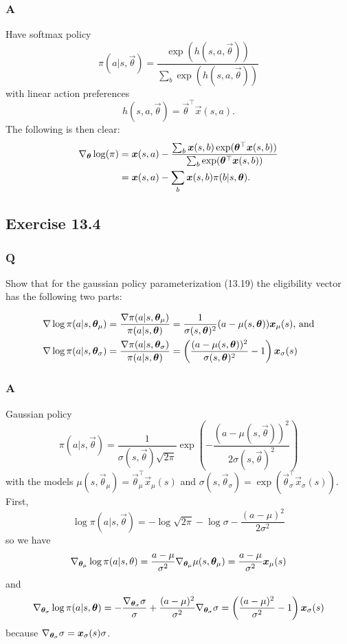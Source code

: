 \subsubsection*{A}
Have softmax policy
\[
    \pi(a \vert{} s, \vec{\theta}) = \frac{\exp(h(s, a, \vec{\theta}))}{\sum_b \exp(h(s, a, \vec{\theta}))}
\]
with linear action preferences 
\[
    h(s, a, \vec{\theta}) = \vec{\theta}^\top \vec{x}(s, a).
\]
The following is then clear:
\begin{align*}
    \nabla_{\boldsymbol{\theta}} \log(\pi) &= \boldsymbol{x}(s, a) - \frac{\sum_b \boldsymbol{x}(s, b) \exp(\boldsymbol{\theta}^\top \boldsymbol{x}(s, b))}{\sum_b \exp(\boldsymbol{\theta}^\top \boldsymbol{x}(s, b))} \\
                                   &= \boldsymbol{x}(s, a) - \sum_b \boldsymbol{x}(s, b) \pi(b \vert{} s, \boldsymbol{\theta}).
\end{align*}

\subsection{Exercise 13.4}
\subsubsection*{Q}
Show that for the gaussian policy parameterization (13.19) the eligibility vector has the following two parts:

\begin{align*}
    \nabla \log \pi(a \vert{} s, \boldsymbol{\theta}_\mu) &= \frac{\nabla \pi(a \vert{} s, \boldsymbol{\theta}_\mu)}{\pi(a \vert{} s, \boldsymbol{\theta})} = \frac{1}{\sigma(s, \boldsymbol{\theta})^2} (a - \mu(s, \boldsymbol{\theta}))\boldsymbol{x}_\mu(s)\text{, and}\\
    \nabla \log \pi(a \vert{} s, \boldsymbol{\theta}_\sigma) &= \frac{\nabla \pi(a \vert{} s, \boldsymbol{\theta}_\sigma)}{\pi(a \vert{} s, \boldsymbol{\theta})} = \left( \frac{(a - \mu(s, \boldsymbol{\theta}))^2}{\sigma(s, \boldsymbol{\theta})^2} - 1 \right) \boldsymbol{x}_\sigma(s)
\end{align*}

\subsubsection*{A}
Gaussian policy
\[
    \pi(a \vert{} s, \vec{\theta}) = \frac{1}{\sigma(s, \vec{\theta}) \sqrt{2 \pi}} \exp\left( - \frac{(a - \mu(s, \vec{\theta}))^2}{2 \sigma(s, \vec{\theta})^2} \right)
\]
with the models $\mu(s, \vec{\theta}_\mu) = \vec{\theta}_\mu^\top\vec{x}_\mu(s)$ and $\sigma(s, \vec{\theta}_\sigma) = \exp(\vec{\theta}_\sigma^\top\vec{x}_\sigma(s))$. First,
\[
    \log \pi(a \vert{} s, \vec{\theta}) = - \log \sqrt{2 \pi} - \log \sigma - \frac{(a - \mu)^2}{2\sigma^2}
\]
so we have 
\[
    \nabla_{\boldsymbol{\theta}_\mu}\log\pi(a \vert{}s, \theta) = \frac{a - \mu}{\sigma^2}\nabla_{\boldsymbol{\theta}_\mu}\mu(s, \boldsymbol{\theta}_\mu) = \frac{a - \mu}{\sigma^2} \boldsymbol{x}_\mu(s)
\]
and
\[
    \nabla_{\boldsymbol{\theta}_\sigma}\log\pi(a \vert{} s, \boldsymbol{\theta}) = - \frac{\nabla_{\boldsymbol{\theta}_\sigma} \sigma}{\sigma} + \frac{(a - \mu)^2}{\sigma^2}\nabla_{\boldsymbol{\theta}_\sigma}\sigma = \left( \frac{(a - \mu)^2}{\sigma^2} - 1 \right)\boldsymbol{x}_\sigma(s) 
\]
because $\nabla_{\boldsymbol{\theta}_\sigma}\sigma = \boldsymbol{x}_\sigma(s) \sigma$.


